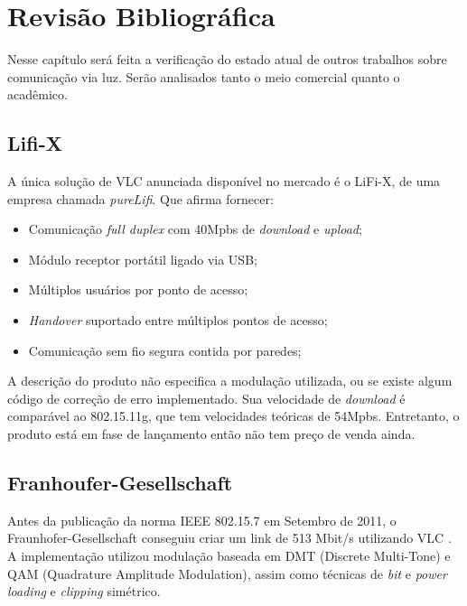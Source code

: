 	\chapter{Revisão Bibliográfica}\label{cap-revisao-bibliografica}
	
	Nesse capítulo será feita a verificação do estado atual de outros trabalhos sobre comunicação via luz. Serão analisados tanto o meio comercial quanto o acadêmico.
	
	\section{Lifi-X}
	
	A única solução de VLC anunciada disponível no mercado é o LiFi-X, de uma empresa chamada \textit{pureLifi}. Que afirma fornecer:
	
	\begin{itemize}
		\item Comunicação \textit{full duplex} com 40Mpbs de \textit{download} e \textit{upload};
		\item Módulo receptor portátil ligado via USB;
		\item Múltiplos usuários por ponto de acesso;
		\item \textit{Handover} suportado entre múltiplos pontos de acesso;
		\item Comunicação sem fio segura contida por paredes;
	\end{itemize}

	A descrição do produto não especifica a modulação utilizada, ou se existe algum código de correção de erro implementado. Sua velocidade de \textit{download} é comparável ao 802.15.11g, que tem velocidades teóricas de 54Mpbs. Entretanto, o produto está em fase de lançamento então não tem preço de venda ainda.

	\section{Franhoufer-Gesellschaft}\label{section:fraunhofer}
	
	Antes da publicação da norma IEEE 802.15.7 em Setembro de 2011, o Fraunhofer-Gesellschaft conseguiu criar um link de 513 Mbit/s utilizando VLC \cite{513mb-fraunhofer}. A implementação utilizou modulação baseada em DMT (Discrete Multi-Tone) e QAM (Quadrature Amplitude Modulation), assim como técnicas de \textit{bit} e \textit{power loading} e \textit{clipping} simétrico.
		
